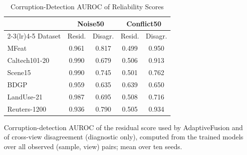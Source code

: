 \begin{table}[!t]
\caption{Corruption-Detection AUROC of Reliability Scores}
\label{tab:auroc}
\centering
\footnotesize
\setlength{\tabcolsep}{3pt}
\begin{tabular}{lcccc}
\toprule
& \multicolumn{2}{c}{Noise50} & \multicolumn{2}{c}{Conflict50} \\
\cmidrule(lr){2-3}\cmidrule(lr){4-5}
Dataset & Resid. & Disagr. & Resid. & Disagr. \\
\midrule
MFeat & 0.961 & 0.817 & 0.499 & 0.950 \\
Caltech101-20 & 0.990 & 0.679 & 0.506 & 0.913 \\
Scene15 & 0.990 & 0.745 & 0.501 & 0.762 \\
BDGP & 0.959 & 0.635 & 0.639 & 0.650 \\
LandUse-21 & 0.987 & 0.695 & 0.508 & 0.716 \\
Reuters-1200 & 0.936 & 0.790 & 0.505 & 0.934 \\
\bottomrule
\end{tabular}
\par\smallskip
\parbox{\linewidth}{\scriptsize Corruption-detection AUROC of the residual score used by AdaptiveFusion and of cross-view disagreement (diagnostic only), computed from the trained models over all observed (sample, view) pairs; mean over ten seeds.}
\end{table}
